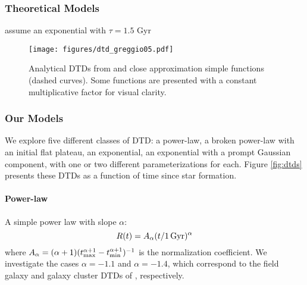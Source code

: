 \documentclass[twocolumn,linenumbers,twocolappendix]{aastex631}
\begin{document}

\subsubsection{Theoretical Models}

\citet{Matteucci1986-SupernovaEnrichment}

\citet{Greggio2005-AnalyticalRates}

\citet{Rajamuthukumar2022-TripleEvolution}

\citet{Schonrich2009-RadialMixing,Weinberg2017-ChemicalEquilibrium} assume an exponential with $\tau=1.5$ Gyr

\begin{figure}
    \centering
    \texttt{[image: figures/dtd\_greggio05.pdf]}
    \caption{Analytical DTDs from \citet[][solid curves]{Greggio2005-AnalyticalRates} and close approximation simple functions (dashed curves). Some functions are presented with a constant multiplicative factor for visual clarity.}
    \label{fig:dtd-greggio05}
\end{figure}

\subsubsection{Our Models}

We explore five different classes of DTD: a power-law, a broken power-law with an initial flat plateau, an exponential, an exponential with a prompt Gaussian component, with one or two different parameterizations for each. Figure \ref{fig:dtds} presents these DTDs as a function of time since star formation.

\paragraph{Power-law} A simple power law with slope $\alpha$:
\begin{equation}
    R(t) = A_\alpha (t/1\,\rm{Gyr})^\alpha
    \label{eq:powerlaw-dtd}
\end{equation}
where $A_\alpha = (\alpha+1)(t_{\rm max}^{\alpha+1} - t_{\rm min}^{\alpha+1})^{-1}$ is the normalization coefficient.
We investigate the cases $\alpha=-1.1$ and $\alpha=-1.4$, which correspond to the field galaxy and galaxy cluster DTDs of \citet{Maoz2017-CosmicDTD}, respectively.
\end{document}
